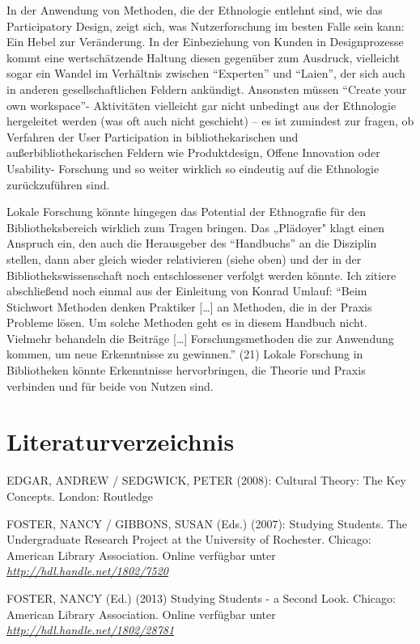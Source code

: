 \documentclass[a4paper,
fontsize=11pt,
oneside,
numbers=noperiodatend,
parskip=half-,
bibliography=totoc,
final
]{scrartcl}
\begin{document}
In der Anwendung von Methoden, die der Ethnologie entlehnt sind, wie das
Participatory Design, zeigt sich, was Nutzerforschung im besten Falle
sein kann: Ein Hebel zur Veränderung. In der Einbeziehung von Kunden in
Designprozesse kommt eine wertschätzende Haltung diesen gegenüber zum
Ausdruck, vielleicht sogar ein Wandel im Verhältnis zwischen
\enquote{Experten} und \enquote{Laien}, der sich auch in anderen
gesellschaftlichen Feldern ankündigt. Ansonsten müssen \enquote{Create
your own workspace}- Aktivitäten vielleicht gar nicht unbedingt aus der
Ethnologie hergeleitet werden (was oft auch nicht geschieht) -- es ist
zumindest zur fragen, ob Verfahren der User Participation in
bibliothekarischen und außerbibliothekarischen Feldern wie
Produktdesign, Offene Innovation oder Usability- Forschung und so weiter
wirklich so eindeutig auf die Ethnologie zurückzuführen sind.

Lokale Forschung könnte hingegen das Potential der Ethnografie für den
Bibliotheksbereich wirklich zum Tragen bringen. Das „Plädoyer" klagt
einen Anspruch ein, den auch die Herausgeber des \enquote{Handbuchs} an
die Disziplin stellen, dann aber gleich wieder relativieren (siehe oben)
und der in der Bibliothekswissenschaft noch entschlossener verfolgt
werden könnte. Ich zitiere abschließend noch einmal aus der Einleitung
von Konrad Umlauf: \enquote{Beim Stichwort Methoden denken Praktiker
{[}\ldots{}{]} an Methoden, die in der Praxis Probleme lösen. Um solche
Methoden geht es in diesem Handbuch nicht. Vielmehr behandeln die
Beiträge {[}\ldots{}{]} Forschungsmethoden die zur Anwendung kommen, um
neue Erkenntnisse zu gewinnen.} (21) Lokale Forschung in Bibliotheken
könnte Erkenntnisse hervorbringen, die Theorie und Praxis verbinden und
für beide von Nutzen sind.

\section*{Literaturverzeichnis}\label{literaturverzeichnis}

EDGAR, ANDREW / SEDGWICK, PETER (2008): Cultural Theory: The Key
Concepts. London: Routledge

FOSTER, NANCY / GIBBONS, SUSAN (Eds.) (2007): Studying Students. The
Undergraduate Research Project at the University of Rochester. Chicago:
American Library Association. Online verfügbar unter
\href{http://hdl.handle.net/1802/7520}{\emph{http://hdl.handle.net/1802/7520}}

FOSTER, NANCY (Ed.) (2013) Studying Students - a Second Look. Chicago:
American Library Association. Online verfügbar unter
\href{http://hdl.handle.net/1802/28781}{\emph{http://hdl.handle.net/1802/28781}}
\end{document}
